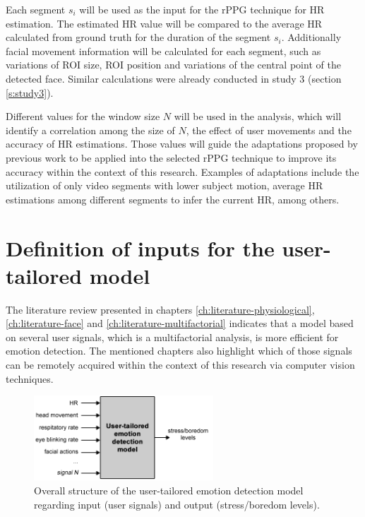 Each segment $s_i$ will be used as the input for the rPPG technique for HR estimation. The estimated HR value will be compared to the average HR calculated from ground truth for the duration of the segment $s_i$. Additionally facial movement information will be calculated for each segment, such as variations of ROI size, ROI position and variations of the central point of the detected face. Similar calculations were already conducted in study 3 (section \ref{s:study3}).

Different values for the window size $N$ will be used in the analysis, which will identify a correlation among the size of $N$, the effect of user movements and the accuracy of HR estimations. Those values will guide the adaptations proposed by previous work \parencite{li2014remote} to be applied into the selected rPPG technique to improve its accuracy within the context of this research. Examples of adaptations include the utilization of only video segments with lower subject motion, average HR estimations among different segments to infer the current HR, among others.

\section{Definition of inputs for the user-tailored model}
\label{sec:closing-definition-inputs}

The literature review presented in chapters \ref{ch:literature-physiological}, \ref{ch:literature-face} and \ref{ch:literature-multifactorial} indicates that a model based on several user signals, which is a multifactorial analysis, is more efficient for emotion detection. The mentioned chapters also highlight which of those signals can be remotely acquired within the context of this research via computer vision techniques.

\begin{figure}[h]
    \centering
    \includegraphics[width=0.6\textwidth]{figures/model-inputs-set.png}
    \caption{Overall structure of the user-tailored emotion detection model regarding input (user signals) and output (stress/boredom levels).}
    \label{fig:model-inputs-set}
\end{figure}

